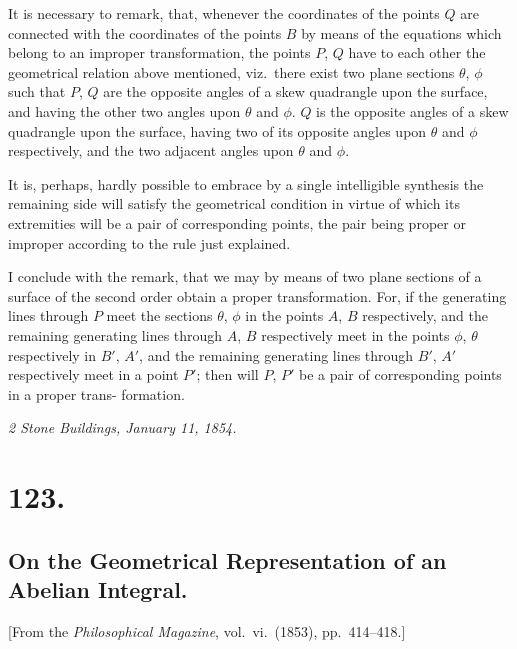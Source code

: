 \documentclass[11pt,a4paper]{book}
\begin{document}
\medskip

It is necessary to remark, that, whenever the coordinates of the points $Q$ are
connected with the coordinates of the points $B$ by means of the equations which
belong to an improper transformation, the points $P$, $Q$ have to each other the
geometrical relation above mentioned, viz.\ there exist two plane sections $\theta$, $\phi$ such
that $P$, $Q$ are the opposite angles of a skew quadrangle upon the surface, and having
the other two angles upon $\theta$ and $\phi$. $Q$ is the opposite angles of a skew quadrangle
upon the surface, having two of its opposite angles upon $\theta$ and $\phi$ respectively, and the
two adjacent angles upon $\theta$ and $\phi$.

\medskip

It is, perhaps, hardly possible to embrace by a single intelligible synthesis the
remaining side will satisfy the geometrical condition in virtue of which its extremities
will be a pair of corresponding points, the pair being proper or improper according
to the rule just explained.

\medskip

I conclude with the remark, that we may by means of two plane sections of a
surface of the second order obtain a proper transformation. For, if the generating
lines through $P$ meet the sections $\theta$, $\phi$ in the points $A$, $B$ respectively, and the
remaining generating lines through $A$, $B$ respectively meet in the points $\phi$, $\theta$ respectively
in $B'$, $A'$, and the remaining generating lines through $B'$, $A'$ respectively meet
in a point $P'$; then will $P$, $P'$ be a pair of corresponding points in a proper trans-
formation.

\medskip
\noindent\textit{2 Stone Buildings, January 11, 1854.}

\section*{123.}
\subsection*{On the Geometrical Representation of an Abelian Integral.}

[From the \textit{Philosophical Magazine}, vol.\ vi.\ (1853), pp.\ 414--418.]
\end{document}
